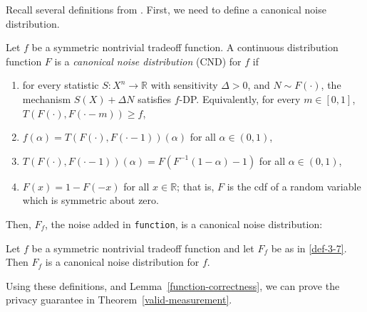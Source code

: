\documentclass{article}
\begin{document}
Recall several definitions from \cite{awan2023canonical}.
First, we need to define a canonical noise distribution.
\begin{definition}
    \label{def-3-1}    
    Let $f$ be a symmetric nontrivial tradeoff function. A {continuous} distribution function $F$ is a \emph{canonical noise distribution} (CND) for $f$ if 
    \begin{enumerate}[(1)]
        \item for every statistic $S: X^n\rightarrow \mathbb{R}$ with sensitivity $\Delta>0$, and $N\sim F(\cdot)$, 
            the mechanism $S(X) + \Delta N$ satisfies $f$-DP. Equivalently, for every $m\in [0,1]$, $T(F(\cdot),F(\cdot-m))\geq f$,
        \item $f(\alpha)=T(F(\cdot),F(\cdot-1))(\alpha)$ for all $\alpha \in (0,1)$,
        \item $T(F(\cdot),F(\cdot-1))(\alpha) = F(F^{-1}(1-\alpha)-1)$ for all $\alpha \in (0,1)$,
        \item $F(x) = 1-F(-x)$ for all $x\in \mathbb{R}$; that is, $F$ is the cdf of a random variable which is symmetric about zero.
    \end{enumerate}
\end{definition}

Then, $F_f$, the noise added in \texttt{function}, is a canonical noise distribution:
\begin{theorem}
    \label{thm-3-9}
    Let $f$ be a symmetric nontrivial tradeoff function and let $F_f$ be as in
        \ref{def-3-7}. Then $F_f$ is a canonical noise distribution for $f$.
\end{theorem}

Using these definitions, and Lemma~\ref{function-correctness},
we can prove the privacy guarantee in Theorem~\ref{valid-measurement}.
\end{document}
